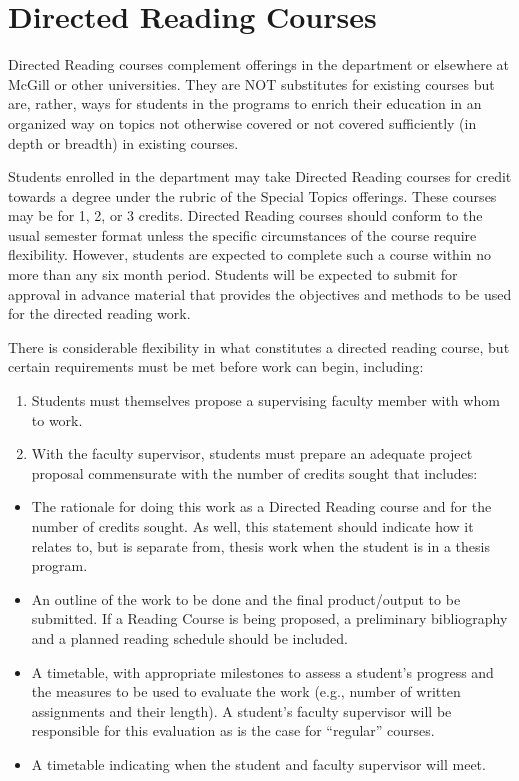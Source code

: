 \documentclass[
  letterpaper,
  DIV=11,
  numbers=noendperiod]{scrreprt}
\begin{document}
\section{Directed Reading Courses}\label{directed-reading-courses}

Directed Reading courses complement offerings in the department or
elsewhere at McGill or other universities. They are NOT substitutes for
existing courses but are, rather, ways for students in the programs to
enrich their education in an organized way on topics not otherwise
covered or not covered sufficiently (in depth or breadth) in existing
courses.

Students enrolled in the department may take Directed Reading courses
for credit towards a degree under the rubric of the Special Topics
offerings. These courses may be for 1, 2, or 3 credits. Directed Reading
courses should conform to the usual semester format unless the specific
circumstances of the course require flexibility. However, students are
expected to complete such a course within no more than any six month
period. Students will be expected to submit for approval in advance
material that provides the objectives and methods to be used for the
directed reading work.

There is considerable flexibility in what constitutes a directed reading
course, but certain requirements must be met before work can begin,
including:

\begin{enumerate}
\def\labelenumi{\arabic{enumi}.}
\item
  Students must themselves propose a supervising faculty member with
  whom to work.
\item
  With the faculty supervisor, students must prepare an adequate project
  proposal commensurate with the number of credits sought that includes:
\end{enumerate}

\begin{itemize}
\item
  The rationale for doing this work as a Directed Reading course and for
  the number of credits sought. As well, this statement should indicate
  how it relates to, but is separate from, thesis work when the student
  is in a thesis program.
\item
  An outline of the work to be done and the final product/output to be
  submitted. If a Reading Course is being proposed, a preliminary
  bibliography and a planned reading schedule should be included.
\item
  A timetable, with appropriate milestones to assess a student's
  progress and the measures to be used to evaluate the work (e.g.,
  number of written assignments and their length). A student's faculty
  supervisor will be responsible for this evaluation as is the case for
  ``regular'' courses.
\item
  A timetable indicating when the student and faculty supervisor will
  meet.
\end{itemize}
\end{document}
